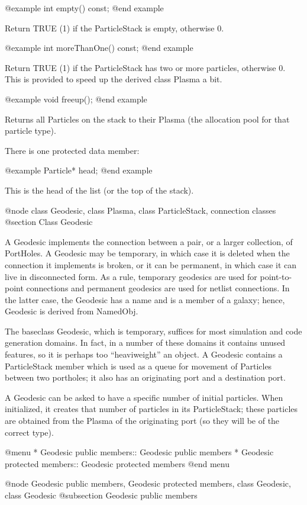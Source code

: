 @example
int empty() const;
@end example

Return TRUE (1) if the ParticleStack is empty, otherwise 0.

@example
int moreThanOne() const;
@end example

Return TRUE (1) if the ParticleStack has two or more particles,
otherwise 0.  This is provided to speed up the derived class Plasma a
bit.

@example
void freeup();
@end example

Returns all Particles on the stack to their Plasma (the allocation pool
for that particle type).

There is one protected data member:

@example
Particle* head;
@end example

This is the head of the list (or the top of the stack).

@node class Geodesic, class Plasma, class ParticleStack, connection classes
@section Class Geodesic

A Geodesic implements the connection between a pair, or a larger
collection, of PortHoles.  A Geodesic may be temporary, in which case it
is deleted when the connection it implements is broken, or it can be
permanent, in which case it can live in disconnected form.  As a rule,
temporary geodesics are used for point-to-point connections and
permanent geodesics are used for netlist connections.  In the latter
case, the Geodesic has a name and is a member of a galaxy; hence,
Geodesic is derived from NamedObj.

The baseclass Geodesic, which is temporary, suffices for most simulation
and code generation domains.  In fact, in a number of these domains it
contains unused features, so it is perhaps too ``heaviweight'' an object.
A Geodesic contains a ParticleStack member which is used as a queue for
movement of Particles between two portholes; it also has an originating
port and a destination port.

A Geodesic can be asked to have a specific number of initial particles.
When initialized, it creates that number of particles in its
ParticleStack; these particles are obtained from the Plasma of the
originating port (so they will be of the correct type).

@menu
* Geodesic public members::     Geodesic public members
* Geodesic protected members::  Geodesic protected members
@end menu

@node Geodesic public members, Geodesic protected members, class Geodesic, class Geodesic
@subsection Geodesic public members


